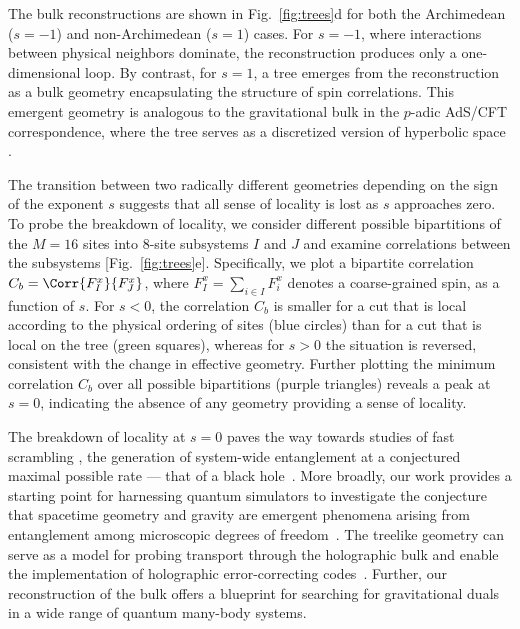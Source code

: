\documentclass[aps,pra,superscriptaddress,12pt]{revtex4-1} %
\begin{document}
\begin{bibunit}
The bulk reconstructions are shown in Fig.~\ref{fig:trees}d for both the Archimedean ($s=-1$) and non-Archimedean ($s=1$) cases.  For $s = -1$, where interactions between physical neighbors dominate, the reconstruction produces only a one-dimensional loop.  By contrast, for $s = 1$, a tree emerges from the reconstruction as a bulk geometry encapsulating the structure of spin correlations. This emergent geometry is analogous to the gravitational bulk in the $p$-adic AdS/CFT correspondence, where the tree serves as a discretized version of hyperbolic space \cite{gubser2017p,heydeman2016tensor}.


The transition between two radically different geometries depending on the sign of the exponent $s$ suggests that all sense of locality is lost as $s$ approaches zero.  To probe the breakdown of locality, we consider different possible bipartitions of the $M=16$ sites into 8-site subsystems $I$ and $J$ and examine correlations between the subsystems [Fig.~\ref{fig:trees}e].  Specifically, we plot a bipartite correlation $C_b = \Corr{F^x_I}{F^x_J}$, where $F^x_I = \sum_{i\in I} F^x_i$ denotes a coarse-grained spin, as a function of $s$.  For $s<0$, the correlation $C_b$ is smaller for a cut that is local according to the physical ordering of sites (blue circles) than for a cut that is local on the tree (green squares), whereas for $s>0$ the situation is reversed, consistent with the change in effective geometry.  Further plotting the minimum correlation $C_b$ over all possible bipartitions (purple triangles) reveals a peak at $s=0$, indicating the absence of any geometry providing a sense of locality.

The breakdown of locality at $s=0$ paves the way towards studies of fast scrambling \cite{bentsen2019treelike}, the generation of system-wide entanglement at a conjectured maximal possible rate --- that of a black hole~\cite{hayden2007black,sekino2008fast}.  More broadly, our work provides a starting point for harnessing quantum simulators to investigate the conjecture that spacetime geometry and gravity are emergent phenomena arising from entanglement among microscopic degrees of freedom~\cite{qi2018does}.  The treelike geometry can serve as a model for probing transport through the holographic bulk and enable the implementation of holographic error-correcting codes~\cite{Pastawski2015, heydeman2016tensor}.  Further, our reconstruction of the bulk offers a blueprint for searching for gravitational duals in a wide range of quantum many-body systems.


\end{bibunit}
\end{document}
